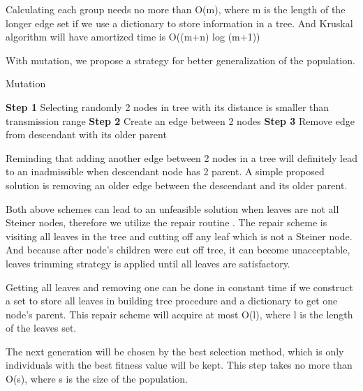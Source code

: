 Calculating each group needs no more than O(m), where m is the length of the longer edge set if we use a dictionary to store information in a tree. And Kruskal algorithm will have amortized time is O((m+n) log (m+1))

With mutation, we propose a strategy for better generalization of the population.

\begin{algorithm}
\caption{Mutation}
\begin{algorithmic}[0]
\State \textbf{Step 1} Selecting randomly 2 nodes in tree with its distance is smaller than transmission range
\State \textbf{Step 2} Create an edge between 2 nodes
\State \textbf{Step 3} Remove edge from descendant with its older parent
\end{algorithmic}
\end{algorithm}

Reminding that adding another edge between 2 nodes in a tree will definitely lead to an inadmissible when descendant node has 2 parent. A simple proposed solution is removing an older edge between the descendant and its older parent.

\noindent{}

Both above schemes can lead to an unfeasible solution when leaves are not all Steiner nodes, therefore we utilize the repair routine \cite{lu2014construction}. The repair scheme is visiting all leaves in the tree and cutting off any leaf which is not a Steiner node. And because after node’s children were cut off tree, it can become unacceptable, leaves trimming strategy is applied until all leaves are satisfactory.

Getting all leaves and removing one can be done in constant time if we construct a set to store all leaves in building tree procedure and a dictionary to get one node’s parent. This repair scheme will acquire at most O(l), where l is the length of the leaves set. 

The next generation will be chosen by the best selection method, which is only individuals with the best fitness value will be kept. This step takes no more than O(s), where s is the size of the population.